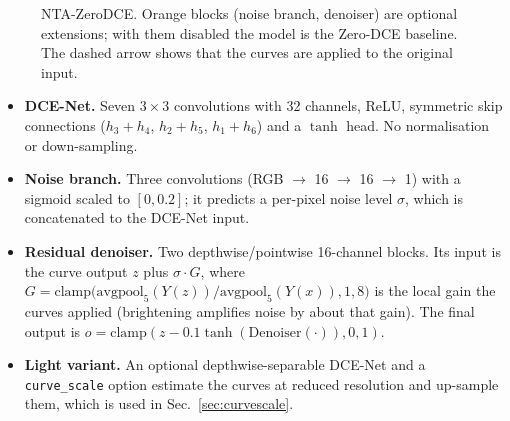 \documentclass{article}
\newcommand{\code}[1]{\texttt{#1}}
\begin{document}
\begin{figure}[!htbp]
\centering
{}
\caption{NTA-ZeroDCE. Orange blocks (noise branch, denoiser) are optional extensions; with them disabled the model is the Zero-DCE baseline. The dashed arrow shows that the curves are applied to the original input.}
\label{fig:arch}
\end{figure}

\begin{itemize}[nosep]
  \item \textbf{DCE-Net.} Seven $3\times3$ convolutions with 32 channels, ReLU, symmetric skip connections ($h_3\!+\!h_4$, $h_2\!+\!h_5$, $h_1\!+\!h_6$) and a $\tanh$ head. No normalisation or down-sampling.
  \item \textbf{Noise branch.} Three convolutions (RGB $\to$ 16 $\to$ 16 $\to$ 1) with a sigmoid scaled to $[0,0.2]$; it predicts a per-pixel noise level $\sigma$, which is concatenated to the DCE-Net input.
  \item \textbf{Residual denoiser.} Two depthwise/pointwise 16-channel blocks. Its input is the curve output $z$ plus $\sigma\cdot G$, where $G=\mathrm{clamp}\!\big(\mathrm{avgpool}_5(Y(z))/\mathrm{avgpool}_5(Y(x)),1,8\big)$ is the local gain the curves applied (brightening amplifies noise by about that gain). The final output is $o=\mathrm{clamp}(z-0.1\tanh(\mathrm{Denoiser}(\cdot)),0,1)$.
  \item \textbf{Light variant.} An optional depthwise-separable DCE-Net and a \code{curve\_scale} option estimate the curves at reduced resolution and up-sample them, which is used in Sec.~\ref{sec:curvescale}.
\end{itemize}
\end{document}
